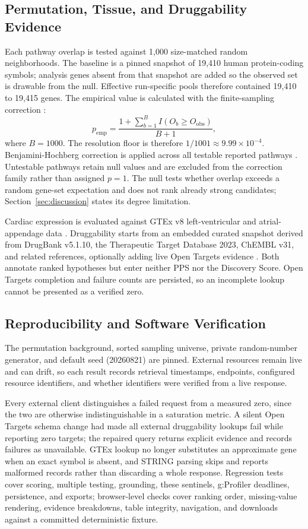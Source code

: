 \documentclass{ieeeaccess}
\begin{document}
\subsection{Permutation, Tissue, and Druggability Evidence}
Each pathway overlap is tested against 1,000 size-matched random neighborhoods. The baseline is a pinned snapshot of 19,410 human protein-coding symbols; analysis genes absent from that snapshot are added so the observed set is drawable from the null. Effective run-specific pools therefore contained 19,410 to 19,415 genes. The empirical value is calculated with the finite-sampling correction \cite{phipson2010permutation}:
\begin{equation}
p_{\mathrm{emp}}=\frac{1+\sum_{b=1}^{B}I(O_b\ge O_{\mathrm{obs}})}{B+1},
\end{equation}
where $B=1000$. The resolution floor is therefore $1/1001\approx 9.99\times10^{-4}$. Benjamini-Hochberg correction is applied across all testable reported pathways \cite{benjamini1995fdr}. Untestable pathways retain null values and are excluded from the correction family rather than assigned $p=1$. The null tests whether overlap exceeds a random gene-set expectation and does not rank already strong candidates; Section~\ref{sec:discussion} states its degree limitation.

Cardiac expression is evaluated against GTEx v8 left-ventricular and atrial-appendage data \cite{gtex2020atlas}. Druggability starts from an embedded curated snapshot derived from DrugBank v5.1.10, the Therapeutic Target Database 2023, ChEMBL v31, and related references, optionally adding live Open Targets evidence \cite{ochoa2021opentargets,zdrazil2024chembl}. Both annotate ranked hypotheses but enter neither PPS nor the Discovery Score. Open Targets completion and failure counts are persisted, so an incomplete lookup cannot be presented as a verified zero.

\subsection{Reproducibility and Software Verification}
The permutation background, sorted sampling universe, private random-number generator, and default seed (20260821) are pinned. External resources remain live and can drift, so each result records retrieval timestamps, endpoints, configured resource identifiers, and whether identifiers were verified from a live response.

Every external client distinguishes a failed request from a measured zero, since the two are otherwise indistinguishable in a saturation metric. A silent Open Targets schema change had made all external druggability lookups fail while reporting zero targets; the repaired query returns explicit evidence and records failures as unavailable. GTEx lookup no longer substitutes an approximate gene when an exact symbol is absent, and STRING parsing skips and reports malformed records rather than discarding a whole response. Regression tests cover scoring, multiple testing, grounding, these sentinels, g:Profiler deadlines, persistence, and exports; browser-level checks cover ranking order, missing-value rendering, evidence breakdowns, table integrity, navigation, and downloads against a committed deterministic fixture.
\end{document}
